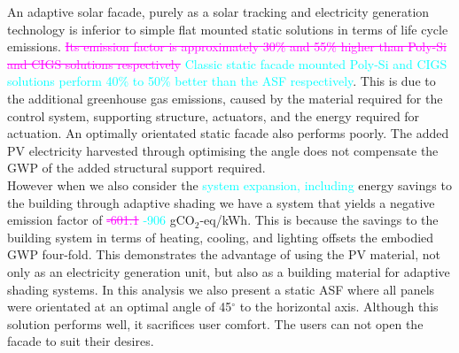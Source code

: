 
An adaptive solar facade, purely as a solar tracking and electricity generation technology is inferior to simple flat mounted static solutions in terms of life cycle emissions. \textcolor{magenta}{\sout{Its emission factor is approximately 30\% and 55\% higher than Poly-Si and CIGS solutions respectively}} \textcolor{cyan}{Classic static facade mounted Poly-Si and CIGS solutions perform 40\% to 50\% better than the ASF respectively}. This is due to the additional greenhouse gas emissions, caused by the material required for the control system, supporting structure, actuators, and the energy required for actuation. An optimally orientated static facade also performs poorly. The added PV electricity harvested through optimising the angle does not compensate the GWP of the added structural support required.\\

However when we also consider the \textcolor{cyan}{system expansion, including} energy savings to the building through adaptive shading we have a system that yields a negative emission factor of \textcolor{magenta}{\sout{ -601.1}} \textcolor{cyan}{-906} gCO$_{2}$-eq/kWh. This is because the savings to the building system in terms of heating, cooling, and lighting offsets the embodied GWP four-fold. This demonstrates the advantage of using the PV material, not only as an electricity generation unit, but also as a building material for adaptive shading systems. In this analysis we also present a static ASF where all panels were orientated at an optimal angle of 45$^{\circ}$ to the horizontal axis. Although this solution performs well, it sacrifices user comfort. The users can not open the facade to suit their desires.\\


